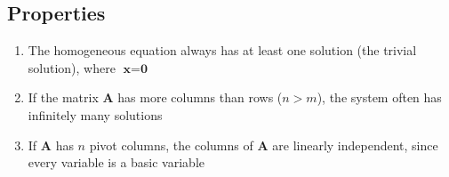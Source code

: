 \documentclass{article}
\begin{document}
\subsection*{Properties}
\begin{enumerate}
    \item The homogeneous equation always has at least one solution (the trivial solution), where $\textbf{x}=\textbf{0}$
    \item If the matrix $\textbf{A}$ has more columns than rows ($n > m$), the system often has infinitely many solutions
    \item If $\textbf{A}$ has $n$ pivot columns, the columns of $\textbf{A}$ are linearly independent, since every variable is a basic variable
\end{enumerate}
\end{document}
